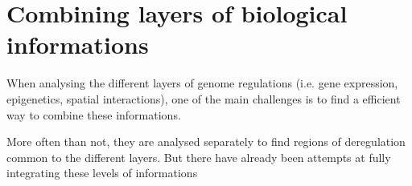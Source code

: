 \section{Combining layers of biological informations}

When analysing the different layers of genome regulations (i.e. gene expression, epigenetics, spatial interactions), one of the main challenges is to find a efficient way to combine these informations. 

More often than not, they are analysed separately to find regions of deregulation common to the different layers. But there have already been attempts at fully integrating these levels of informations %


